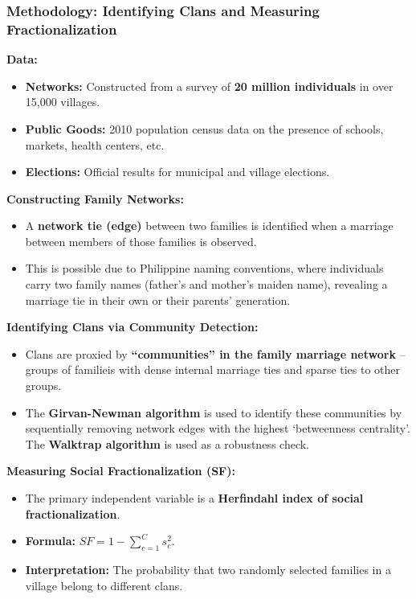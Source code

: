 \documentclass{article}
\begin{document}
    \subsubsection{Methodology: Identifying Clans and Measuring Fractionalization}

    \noindent \textbf{Data:}
    \begin{itemize}
        \item \textbf{Networks:} Constructed from a survey of
        \textbf{20 million individuals} in over 15,000 villages.
        \item \textbf{Public Goods:} 2010 population census data on the
        presence of schools, markets, health centers, etc.
        \item \textbf{Elections:} Official results for municipal and village
        elections.
    \end{itemize}

    \noindent \textbf{Constructing Family Networks:}
    \begin{itemize}
        \item A \textbf{network tie (edge)} between two families is
        identified when a marriage between members of those families is
        observed.
        \item This is possible due to Philippine naming conventions, where
        individuals carry two family names (father's and mother's maiden
        name), revealing a marriage tie in their own or their parents'
        generation.
    \end{itemize}

    \noindent \textbf{Identifying Clans via Community Detection:}
    \begin{itemize}
        \item Clans are proxied by
        \textbf{``communities'' in the family marriage network} -- groups of
        familieis with dense internal marriage ties and sparse ties to other
        groups.
        \item The \textbf{Girvan-Newman algorithm} is used to identify these
        communities by sequentially removing network edges with the highest
        `betweenness centrality'. The \textbf{Walktrap algorithm} is used as
        a robustness check.
    \end{itemize}

    \noindent \textbf{Measuring Social Fractionalization (SF):}
    \begin{itemize}
        \item The primary independent variable is a
        \textbf{Herfindahl index of social fractionalization}.
        \item \textbf{Formula:} $SF = 1 - \sum^{C}_{c=1}s^2_c$.
        \item \textbf{Interpretation:} The probability that two randomly
        selected families in a village belong to different clans.
    \end{itemize}
\end{document}
